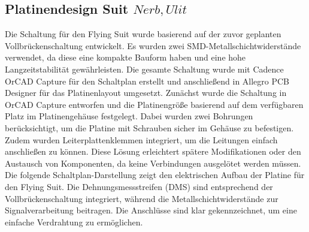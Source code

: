 \subsection{Platinendesign Suit \(Nerb, Ulit\)}
Die Schaltung für den Flying Suit wurde basierend auf der zuvor geplanten Vollbrückenschaltung entwickelt.
Es wurden zwei SMD-Metallschichtwiderstände verwendet, da diese eine kompakte Bauform haben und eine hohe Langzeitstabilität gewährleisten.
Die gesamte Schaltung wurde mit Cadence OrCAD Capture für den Schaltplan erstellt und anschließend in Allegro PCB Designer für das Platinenlayout umgesetzt.
Zunächst wurde die Schaltung in OrCAD Capture entworfen und die Platinengröße basierend auf dem verfügbaren Platz im Platinengehäuse festgelegt.
Dabei wurden zwei Bohrungen berücksichtigt, um die Platine mit Schrauben sicher im Gehäuse zu befestigen.
Zudem wurden Leiterplattenklemmen integriert, um die Leitungen einfach anschließen zu können.
Diese Lösung erleichtert spätere Modifikationen oder den Austausch von Komponenten, da keine Verbindungen ausgelötet werden müssen.
Die folgende Schaltplan-Darstellung zeigt den elektrischen Aufbau der Platine für den Flying Suit.
Die Dehnungsmessstreifen (DMS) sind entsprechend der Vollbrückenschaltung integriert, während die Metallschichtwiderstände zur Signalverarbeitung beitragen.
Die Anschlüsse sind klar gekennzeichnet, um eine einfache Verdrahtung zu ermöglichen.
